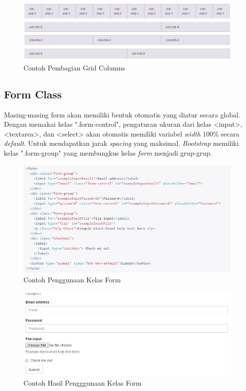 	\begin{figure}[H]
		\centering
		\includegraphics[scale=0.75]{Gambar/kolom}
		\caption{Contoh Pembagian Grid Columns}
		\label{fig:gridCol}
	\end{figure}
	
	\subsection{Form Class}
	\label{sub: formClass}
		Masing-masing form akan memiliki bentuk otomatis yang diatur secara global. Dengan memakai kelas ".form-control", pengaturan ukuran dari kelas <input>, <textarea>, dan <select> akan otomatis memiliki variabel \textit{width} 100\% secara \textit{default}. Untuk mendapatkan jarak \textit{spacing} yang maksimal, \textit{Bootstrap} memiliki kelas ".form-group" yang membungkus kelas \textit{form} menjadi grup-grup.
		
			\begin{figure}[H]
				\centering
				\includegraphics[scale=0.75]{Gambar/formCode}
				\caption{Contoh Penggunaan Kelas Form}
				\label{fig:formCode}
			\end{figure}
			
			\begin{figure}[H]
				\centering
				\includegraphics[scale=0.75]{Gambar/hasilForm}
				\caption{Contoh Hasil Pengggunaan Kelas Form}
				\label{fig:hasilForm}
			\end{figure}